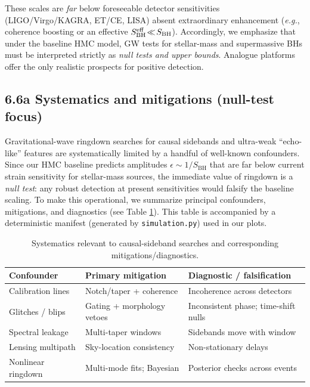 \documentclass[aps,prd,preprint,onecolumn,superscriptaddress,nofootinbib,longbibliography,floatfix,11pt,showpacs,showkeys]{revtex4-2}
\newcommand{\eg}{\textit{e.g.}\xspace}
\newcommand{\HMC}{\textsc{HMC}\xspace}
\theoremstyle{plain}
\theoremstyle{definition}
\theoremstyle{remark}
\begin{document}
These scales are \emph{far} below foreseeable detector sensitivities (LIGO/Virgo/KAGRA, ET/CE, LISA) absent extraordinary enhancement (\eg, coherence boosting or an effective $S_{\rm BH}^{\rm eff}\!\ll\!S_{\rm BH}$).
Accordingly, we emphasize that under the baseline \HMC{} model, GW tests for stellar-mass and supermassive BHs must be interpreted strictly as \emph{null tests and upper bounds}. Analogue platforms offer the only realistic prospects for positive detection.

\subsection*{6.6a Systematics and mitigations (null-test focus)}
Gravitational-wave ringdown searches for causal sidebands and ultra-weak ``echo-like'' features are systematically limited by a handful of well-known confounders. Since our HMC baseline predicts amplitudes \(\epsilon\!\sim\!1/S_{\mathrm{BH}}\) that are far below current strain sensitivity for stellar-mass sources, the immediate value of ringdown is a \emph{null test}: any robust detection at present sensitivities would falsify the baseline scaling. To make this operational, we summarize principal confounders, mitigations, and diagnostics (see Table \ref{tab:gw-systematics}). This table is accompanied by a deterministic manifest (generated by \texttt{simulation.py}) used in our plots.

\begin{table}[t]
\centering
\begin{tabular*}{\textwidth}{@{\extracolsep{\fill}}lll@{}}
\textbf{Confounder} & \textbf{Primary mitigation} & \textbf{Diagnostic / falsification} \\\hline
Calibration lines & Notch/taper + coherence & Incoherence across detectors \\
Glitches / blips & Gating + morphology vetoes & Inconsistent phase; time-shift nulls \\
Spectral leakage & Multi-taper windows & Sidebands move with window \\
Lensing multipath & Sky-location consistency & Non-stationary delays \\
Nonlinear ringdown & Multi-mode fits; Bayesian & Posterior checks across events \\
\end{tabular*}
\caption{Systematics relevant to causal-sideband searches and corresponding mitigations/diagnostics.}
\label{tab:gw-systematics}
\end{table}
\end{document}
